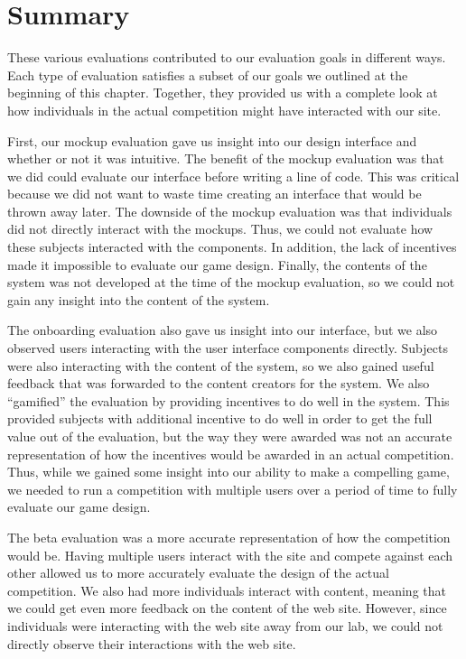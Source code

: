 \section{Summary}

These various evaluations contributed to our evaluation goals in different ways. Each type of evaluation satisfies a subset of our goals we outlined at the beginning of this chapter. Together, they provided us with a complete look at how individuals in the actual competition might have interacted with our site.

First, our mockup evaluation gave us insight into our design interface and whether or not it was intuitive. The benefit of the mockup evaluation was that we did could evaluate our interface before writing a line of code. This was critical because we did not want to waste time creating an interface that would be thrown away later. The downside of the mockup evaluation was that individuals did not directly interact with the mockups. Thus, we could not evaluate how these subjects interacted with the components. In addition, the lack of incentives made it impossible to evaluate our game design. Finally, the contents of the system was not developed at the time of the mockup evaluation, so we could not gain any insight into the content of the system.

The onboarding evaluation also gave us insight into our interface, but we also observed users interacting with the user interface components directly. Subjects were also interacting with the content of the system, so we also gained useful feedback that was forwarded to the content creators for the system. We also ``gamified'' the evaluation by providing incentives to do well in the system. This provided subjects with additional incentive to do well in order to get the full value out of the evaluation, but the way they were awarded was not an accurate representation of how the incentives would be awarded in an actual competition. Thus, while we gained some insight into our ability to make a compelling game, we needed to run a competition with multiple users over a period of time to fully evaluate our game design.

The beta evaluation was a more accurate representation of how the competition would be. Having multiple users interact with the site and compete against each other allowed us to more accurately evaluate the design of the actual competition. We also had more individuals interact with content, meaning that we could get even more feedback on the content of the web site. However, since individuals were interacting with the web site away from our lab, we could not directly observe their interactions with the web site.

